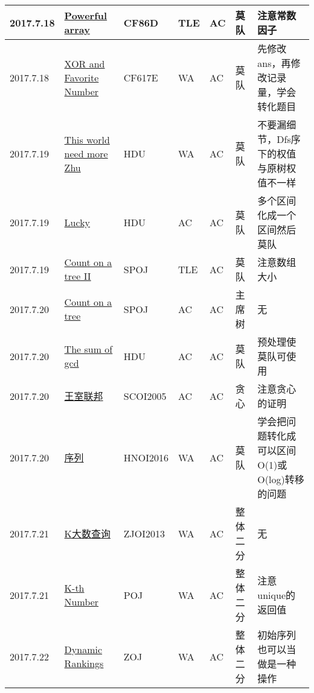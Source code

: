 \documentclass[a4paper]{article}
\begin{document}
\begin{longtable}{|p{1.5cm}|p{2.5cm}|p{1.6cm}|p{1.6cm}|p{1cm}|p{3cm}|p{4cm}|}
		\hline
		2017.7.18 & \href {http://codeforces.com/problemset/problem/86/D}{Powerful array}
		 & CF86D & TLE & AC & 莫队 & 注意常数因子\\
		
		\hline
		2017.7.18 & \href {http://codeforces.com/problemset/problem/617/E}{XOR and Favorite Number}
		 & CF617E & WA & AC & 莫队 & 先修改ans，再修改记录量，学会转化题目\\
		
		\hline
		2017.7.19 & \href {https://vjudge.net/problem/HDU-5799}{This world need more Zhu}
		 & HDU & WA & AC & 莫队 & 不要漏细节，Dfs序下的权值与原树权值不一样\\
		
		\hline
		2017.7.19 & \href {https://vjudge.net/problem/HDU-5213}{Lucky}
		 & HDU & AC & AC & 莫队 & 多个区间化成一个区间然后莫队\\
		
		\hline
		2017.7.19 & \href {https://vjudge.net/problem/SPOJ-COT2}{Count on a tree II}
		 & SPOJ & TLE & AC & 莫队 & 注意数组大小\\
		
		\hline
		2017.7.20 & \href {https://vjudge.net/problem/SPOJ-COT}{Count on a tree}
		 & SPOJ & AC & AC & 主席树 & 无\\
		
		\hline
		2017.7.20 & \href {https://vjudge.net/problem/HDU-5381}{The sum of gcd}
		 & HDU & AC & AC & 莫队 & 预处理使莫队可使用\\
		
		\hline
		2017.7.20 & \href {http://www.lydsy.com/JudgeOnline/problem.php?id=1086}{王室联邦}
		 & SCOI2005 & AC & AC & 贪心 & 注意贪心的证明\\
		
		\hline
		2017.7.20 & \href {http://www.lydsy.com/JudgeOnline/problem.php?id=4540}{序列}
		 & HNOI2016 & WA & AC & 莫队 & 学会把问题转化成可以区间O(1)或O(log)转移的问题\\
		
		\hline
		2017.7.21 & \href {http://www.lydsy.com/JudgeOnline/problem.php?id=3110}{K大数查询}
		 & ZJOI2013 & WA & AC & 整体二分 & 无\\
		
		\hline
		2017.7.21 & \href {https://vjudge.net/problem/POJ-2104}{K-th Number}
		 & POJ & WA & AC & 整体二分 & 注意unique的返回值\\
		
		\hline
		2017.7.22 & \href {https://vjudge.net/problem/ZOJ-2112}{Dynamic Rankings}
		 & ZOJ & WA & AC & 整体二分 & 初始序列也可以当做是一种操作\\
		

\end{longtable}
\end{document}
